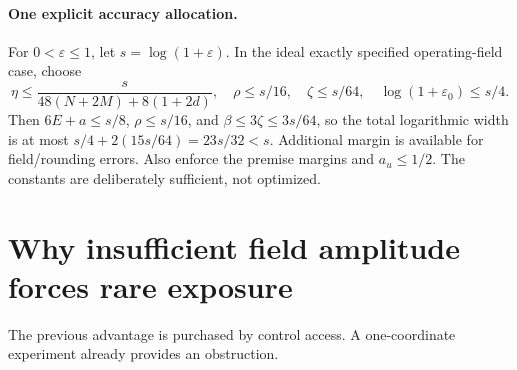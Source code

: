 \documentclass[11pt]{article}
\newcommand{\eps}{\varepsilon}
\begin{document}
\paragraph{One explicit accuracy allocation.}
For $0<\eps\le1$, let $s=\log(1+\eps)$. In the ideal exactly specified operating-field case, choose
\[
 \eta\le\frac{s}{48(N+2M)+8(1+2d)},\quad
 \rho\le s/16,\quad \zeta\le s/64,\quad \log(1+\eps_0)\le s/4.
\]
Then $6E+a\le s/8$, $\rho\le s/16$, and $\beta\le3\zeta\le3s/64$, so the total logarithmic width is at most $s/4+2(15s/64)=23s/32<s$. Additional margin is available for field/rounding errors. Also enforce the premise margins and $a_u\le1/2$. The constants are deliberately sufficient, not optimized.

\section{Why insufficient field amplitude forces rare exposure}
\label{sec:lower}
The previous advantage is purchased by control access. A one-coordinate experiment already provides an obstruction.
\end{document}
